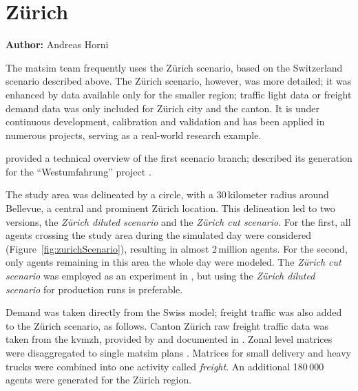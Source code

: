 \section{Zürich}
\label{sec:zhscenario}
\hfill \textbf{Author:} Andreas Horni


The \gls{matsim} team frequently uses the Zürich scenario, based on the Switzerland scenario described above. The Zürich scenario, however, was more detailed; it was enhanced by data available only for the smaller region; \eg traffic light data or freight demand data was only included for Zürich city and the canton. It is under continuous development, calibration and validation and has been applied in numerous projects, serving as a real-world research example.   

\citet{HorniEtAl_TechRep_IVT_2011_a} provided a technical overview of the first scenario branch; \citet[][]{BalmerEtAl_ResRep_bdktzrh_2009} described its generation for the ``Westumfahrung'' project . 

The study area was delineated by a circle, with a 30\,kilometer radius around Bellevue, a central and prominent Zürich location. This delineation led to two versions,  the \emph{Zürich diluted scenario} and the \emph{Zürich cut scenario}. For the first, all agents crossing the study area during the simulated day were considered (Figure~\ref{fig:zurichScenario}), resulting in almost 2\,million agents. For the second, only agents remaining in this area the whole day were modeled. The \emph{Zürich cut scenario} was employed as an experiment in \citet[][]{Hackney_PhDThesis_2009}, but using the \emph{Zürich diluted scenario} for production runs is preferable.

Demand was taken directly from the Swiss model; freight traffic was also added to the Zürich scenario, as follows. Canton Zürich raw freight traffic data was taken from the \gls{kvmzh}, provided by \citet{AMV_Webpage_2011} and documented in \citet[][]{GottardiBuergler_SV_1999}. Zonal level matrices were disaggregated to single \gls{matsim} plans \citep[][]{ShahM_TechRep_IVT_2010}. Matrices for small delivery and heavy trucks were combined into one activity called \emph{freight}. An additional 180\,000 agents were generated for the Zürich region.


